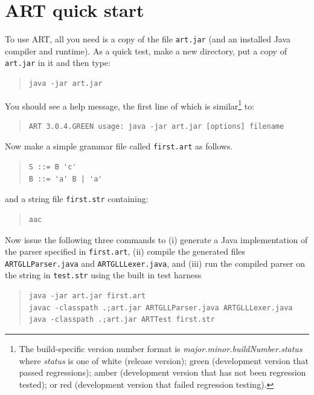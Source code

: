 \chapter{ART quick start}

To use ART, all you need is a copy of the file {\tt art.jar} (and an installed Java compiler and runtime). As a quick test, make a new directory, put a copy of {\tt art.jar} in it and then type:

\begin{quote}
\begin{verbatim}
java -jar art.jar
\end{verbatim}
\end{quote}

\noindent You should see a help message, the first line of which is similar\footnote{The build-specific version number format is {\em major.minor.buildNumber.status} where {\em status} is one of {\sf white} (release version); {\sf green} (development version that passed regressions); {\sf amber} (development version that has not been regression tested); or {\sf red} (development version that failed regression testing).}
 to:
\begin{quote}
\begin{verbatim}
ART 3.0.4.GREEN usage: java -jar art.jar [options] filename
\end{verbatim}
\end{quote}
Now make a simple grammar file called {\tt first.art} as follows.
\begin{quote}
\begin{verbatim}
S ::= B 'c'
B ::= 'a' B | 'a'
\end{verbatim}
\end{quote}
and a string file {\tt first.str} containing:
\begin{quote}
\begin{verbatim}
aac
\end{verbatim}
\end{quote}
Now issue the following three commands to (i) generate a Java implementation of the parser specified in {\tt first.art}, (ii) compile the generated files {\tt ARTGLLParser.java} and {\tt ARTGLLLexer.java}, and (iii) run the compiled parser on the string in {\tt test.str} using the built in test harness 
\begin{quote}
\begin{verbatim}
java -jar art.jar first.art 
javac -classpath .;art.jar ARTGLLParser.java ARTGLLLexer.java
java -classpath .;art.jar ARTTest first.str
\end{verbatim}
\end{quote}
